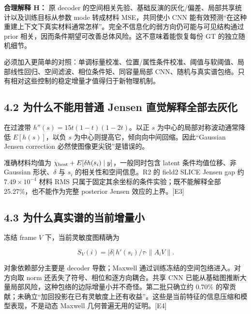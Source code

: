 \documentclass[
  11pt,
  a4paper,
]{article}
\begin{document}
\textbf{合理解释 H：} 原 decoder
的空间相关先验、基础反演的灰化/偏差、局部共享统计以及训练目标从参数 mode
转成材料 MSE，共同使小 CNN
能有效预测``在这种重建上下文下真实材料通常怎样''。完全不信息化的弱方向仍可能与可见结构通过
prior 相关，因而条件期望可改善总体风险。这不意味着能恢复每份 GT
的独立随机细节。

必须加入更简单的对照：单调标量校准、位置/属性条件校准、阈值与软阈值、局部线性回归、空间滤波、相位条件矩、同容量局部
CNN、随机与真实谱包络。只有相对这些控制的稳定增量才值得归于新物理机制。

\hypertarget{ux4e3aux4ec0ux4e48ux4e0dux80fdux7528ux666eux901a-jensen-ux76f4ux89c9ux89e3ux91caux5168ux90e8ux53bbux7070ux5316}{%
\subsection{4.2 为什么不能用普通 Jensen
直觉解释全部去灰化}\label{ux4e3aux4ec0ux4e48ux4e0dux80fdux7528ux666eux901a-jensen-ux76f4ux89c9ux89e3ux91caux5168ux90e8ux53bbux7070ux5316}}

在过渡带 \(h''(s)=15t(1-t)(1-2t)\)。以正 \(s\)
为中心的局部对称波动通常降低 \(E[h(s)]\)，以负 \(s\)
为中心则提高它，倾向向中间回缩。因此``Gaussian Jensen correction
必然使图像更尖锐''是错误的。

准确材料均值为 \(\chi_{\rm host}+E[\delta h(s_i)\mid y]\)，一般同时包含
latent 条件均值位移、非 Gaussian 形状、\(\delta\) 与 \(s_i\)
的相关性和空间信息。R2 的 field2 SLICE Jensen gap 约
\(7.49\times10^{-4}\) 材料 RMS
只属于固定其余坐标的条件实验；既不能解释全部 25.27\%，也不能作为完整
posterior Jensen 效应的上界。{[}E3{]}

\hypertarget{ux4e3aux4ec0ux4e48ux771fux5b9eux8c31ux7684ux5f53ux524dux589eux91cfux5c0f}{%
\subsection{4.3
为什么真实谱的当前增量小}\label{ux4e3aux4ec0ux4e48ux771fux5b9eux8c31ux7684ux5f53ux524dux589eux91cfux5c0f}}

冻结 frame \(V\) 下，当前灵敏度图精确为

\[S_V(i)=|\delta|\,h'(s_i)/\tau\cdot\|A_iV\|.\]

对象依赖部分主要是 decoder 导数；Maxwell
通过训练冻结的空间包络进入。对方向取 norm
还丢失了符号、相位和逐方向耦合。共享 CNN
已能从基础图推断大量局部风险，这种包络的边际增量小并不奇怪。第二批只确立约
0.70\%
的窄贡献；未确立``加回投影在已有灵敏度上还有收益''。这些是当前特征的信息压缩和模型表现，不是动态
Maxwell 几何普遍无用的证明。{[}E4{]}
\end{document}
